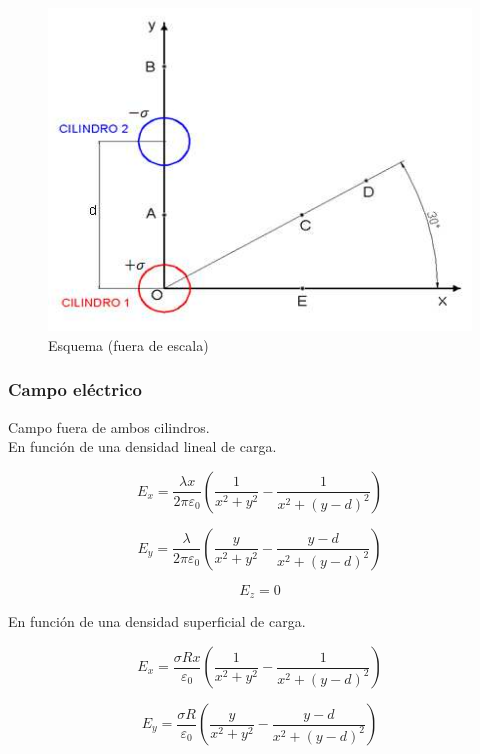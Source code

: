 \documentclass{article}
\begin{document}
\begin{figure}[H]
	\centering
	\includegraphics[scale=1]{2.png}
	\caption{Esquema (fuera de escala)}
	\label{fig:2}
\end{figure}

\subsubsection{Campo eléctrico}
    Campo fuera de ambos cilindros.\\

En función de una densidad lineal de carga.
	
    \begin{equation}
    	E_x = \frac{\lambda x}{2 \pi \varepsilon_0} \left(\frac{1}{x^2 + y^2} - \frac{1}{x^2 + (y-d)^2}\right)  
    \end{equation}

	\begin{equation}
		E_y = \frac{\lambda}{2 \pi \varepsilon_0} \left(\frac{y}{x^2 + y^2} - \frac{y-d}{x^2 + (y-d)^2}\right)
	\end{equation}

    \begin{equation}
		E_z = 0
	\end{equation}

En función de una densidad superficial de carga.
	    
    \begin{equation}
    	E_x = \frac{\sigma Rx}{\varepsilon_0} \left(\frac{1}{x^2 + y^2} - 
        \frac{1}{x^2 + (y-d)^2}\right)  
    \end{equation}

	\begin{equation}
		E_y = \frac{\sigma R}{\varepsilon_0} \left(\frac{y}{x^2 + y^2} - 
        \frac{y-d}{x^2 + (y-d)^2}\right)
	\end{equation}
    
\end{document}
